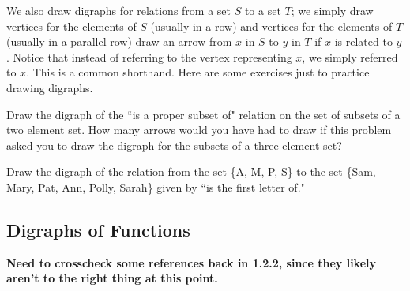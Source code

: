 We also draw digraphs for relations from a set $S$ to a  set
$T$; we simply draw vertices for the elements of $S$ (usually
in a row) and vertices for the elements of $T$ (usually in a
parallel row) draw an arrow from
$x$ in $S$ to $y$ in $T$ if $x$ is related to $y$.  Notice
that instead of referring to the vertex representing $x$, we
simply referred to $x$.  This is a common shorthand.  Here are
some exercises just to practice drawing digraphs.

\bp
\item Draw the digraph of the ``is a proper subset of" relation
on the set of subsets of a two element set.  How many arrows
would you have had to draw if this problem asked you to draw
the digraph for the subsets of a three-element set?

\item Draw the digraph of the relation from the set \{A, M, P,
S\} to the set \{Sam, Mary, Pat, Ann, Polly, Sarah\}  given by
``is the first letter of."
\solution{\begin{center}
\mbox{\psfig{figure=initialdigraph.eps%
}}
\end{center} }
\ep

\subsection{Digraphs of Functions}\label{digraphsoffunctions}
\textbf{Need to crosscheck some references back in 1.2.2, since they
  likely aren't to the right thing at this point.}

